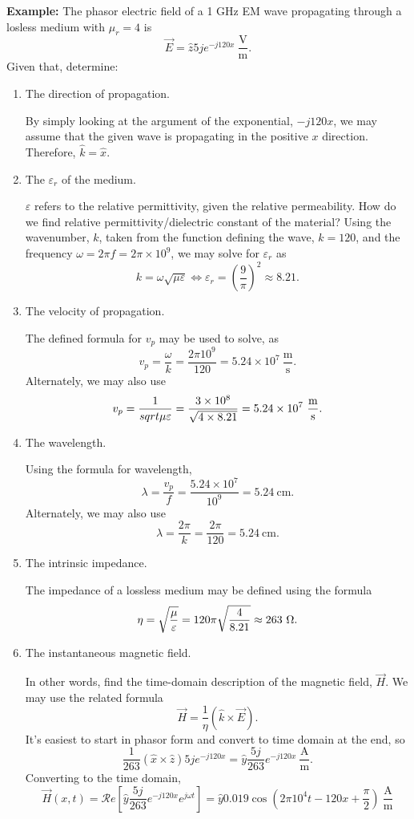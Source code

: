 \documentclass{article}
\begin{document}
		\textbf{Example:}
		The phasor electric field of a 1 GHz EM wave propagating through a losless medium with \(\mu_r=4\) is \[
			\vec{E} = \hat{z} 5 j e^{-j120x} \ \mathrm{\frac{V}{m}}.
		\]
		Given that, determine:
		\begin{enumerate}[label=\alph*)]
			\item The direction of propagation.

				By simply looking at the argument of the exponential, \(-j120x\), we may assume that the given wave is propagating in the positive \(x\) direction. Therefore, \(\hat{k} = \hat{x}\).
			\item The \(\varepsilon_r\) of the medium.

				\(\varepsilon\) refers to the relative permittivity, given the relative permeability. How do we find relative permittivity/dielectric constant of the material? Using the wavenumber, \(k\), taken from the function defining the wave, \(k = 120\), and the frequency \(\omega = 2\pi f = 2 \pi \times 10^9\), we may solve for \(\varepsilon_r\) as
				\[
				  k = \omega \sqrt{\mu\varepsilon} \Leftrightarrow \varepsilon_r = \left(\frac{9}{\pi}\right)^2 \approx 8.21.
				\]
			\item The velocity of propagation.

				The defined formula for \(v_p\) may be used to solve, as
				\[
					v_p = \frac{\omega}{k} = \frac{2\pi 10^9}{120} = 5.24 \times 10^7 \ \mathrm{\frac{m}{s}}.
				\]
				Alternately, we may also use
				\[
					v_p = \frac{1}{\\sqrt{\mu \varepsilon}} = \frac{3 \times 10^8}{\sqrt{4 \times 8.21}} = 5.24 \times 10^7 \ \mathrm{\frac{m}{s}}.
				\]
			\item The wavelength.
				
				Using the formula for wavelength,
				\[
					\lambda = \frac{v_p}{f} = \frac{5.24 \times 10^7}{10^9} = 5.24 \ \mathrm{cm}.
				\]
				Alternately, we may also use 
				\[
					\lambda = \frac{2\pi}{k} = \frac{2\pi}{120} = 5.24 \ \mathrm{cm}.
				\]
			\item The intrinsic impedance. 

				The impedance of a lossless medium may be defined using the formula
				\[
				  \eta = \sqrt{\frac{\mu}{\varepsilon}} = 120\pi\sqrt{\frac{4}{8.21}} \approx 263 \ \ohm.
				\]
				\item The instantaneous magnetic field.

					In other words, find the time-domain description of the magnetic field, \(\vec{H}\). We may use the related formula
					\[
					  \vec{H} = \frac{1}{\eta}\left(\hat{k} \times \vec{E}\right).
					\]
					It's easiest to start in phasor form and convert to time domain at the end, so
					\[
						\frac{1}{263}\left(\hat{x}\times \hat{z}\right)5je^{-j120x} = \hat{y}\frac{5j}{263}e^{-j120x} \ \mathrm{\frac{A}{m}}.
					\]
					Converting to the time domain,
					\[
						\vec{H}(x,t) = \mathcal{R}e\left[\hat{y}\frac{5j}{263}e^{-j120x}e^{j\omega t}\right] = \hat{y}0.019\cos{\left(2\pi 10^4 t - 120x + \frac{\pi}{2}\right)} \ \mathrm{\frac{A}{m}}
					\]
		\end{enumerate}
		\setcounter{subsection}{3}
\end{document}
